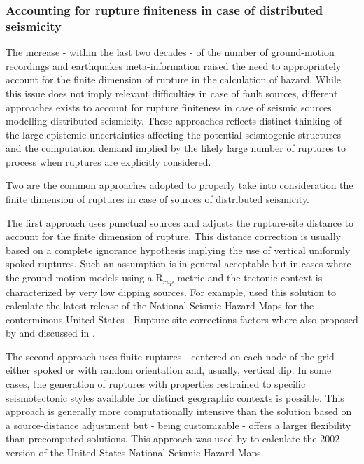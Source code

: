 \subsubsection{Accounting for rupture finiteness in case of distributed 
seismicity}
% 
The increase - within the last two decades - of the number of 
ground-motion recordings and earthquakes meta-information raised 
the need to appropriately account for the finite dimension of rupture 
in the calculation of hazard.
% 
While this issue does not imply relevant difficulties in case of 
fault sources, different approaches exists to account for rupture 
finiteness in case of seismic sources modelling distributed 
seismicity. 
% 
These approaches reflects distinct thinking of the 
large epistemic uncertainties affecting the potential seismogenic 
structures and the computation demand implied by the likely 
large number of ruptures to process when ruptures are explicitly
considered.

Two are the common approaches adopted to properly take into 
consideration the finite dimension of ruptures in case of sources 
of distributed seismicity.

The first approach uses punctual sources and adjusts the 
rupture-site distance to account for the finite dimension of rupture.
%
This distance correction is usually based on a complete ignorance 
hypothesis implying the use of vertical uniformly spoked ruptures.
%
Such an assumption is in general acceptable but in cases where the 
ground-motion models using a R$_{rup}$ metric and the tectonic context
is characterized by very low dipping sources.
%
For example, \citet{petersen2008} used this solution to calculate
the latest release of the National Seismic Hazard Maps for the 
conterminous United States \citep[see also][]{harmsen2008}. 
%
Rupture-site corrections factors where also proposed by 
\citet{scherbaum2004} and discussed in \citet{beyer2006}.

The second approach uses finite ruptures - centered on each node 
of the grid - either spoked or with random orientation and,  
usually, vertical dip. 
%
In some cases, the generation of ruptures with properties 
restrained to specific seismotectonic styles available for distinct  
geographic contexts is possible. 
%
This approach is generally more computationally intensive than the 
solution based on a source-distance adjustment but - being 
customizable - offers a larger flexibility than precomputed solutions.
%
This approach was used by \citet{frankel2002} to calculate the 2002
version of the United States National Seismic Hazard Maps.
%
